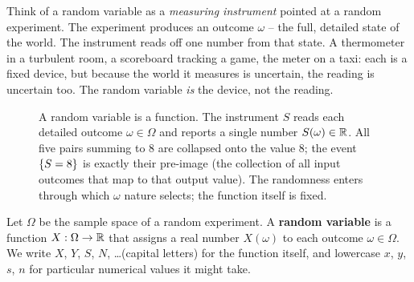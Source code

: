 \begin{intuitionbox}
Think of a random variable as a \emph{measuring instrument} pointed at a random
experiment. The experiment produces an outcome $\omega$ -- the full, detailed state of
the world. The instrument reads off one number from that state. A thermometer in a
turbulent room, a scoreboard tracking a game, the meter on a taxi: each is a fixed
device, but because the world it measures is uncertain, the reading is uncertain too.
The random variable \emph{is} the device, not the reading.
\end{intuitionbox}

\begin{figure}[H]
\centering
{}
\caption{A random variable is a function. The instrument $S$ reads each detailed
outcome $\omega\in\Omega$ and reports a single number $S(\omega)\in\mathbb{R}$. All five
pairs summing to $8$ are collapsed onto the value $8$; the event $\{S=8\}$ is exactly
their pre-image (the collection of all input outcomes that map to that output value).
The randomness enters through which $\omega$ nature selects; the function itself is fixed.}
\label{ch06:fig-rv-map}
\end{figure}

\begin{definition}
\label{ch06:def-rv}
Let $\Omega$ be the sample space of a random experiment. A \textbf{random variable} is
a function $X : \Omega \to \mathbb{R}$ that assigns a real number $X(\omega)$ to each outcome
$\omega \in \Omega$. We write $X$, $Y$, $S$, $N$, \dots (capital letters) for the
function itself, and lowercase $x$, $y$, $s$, $n$ for particular numerical values it
might take.
\end{definition}

